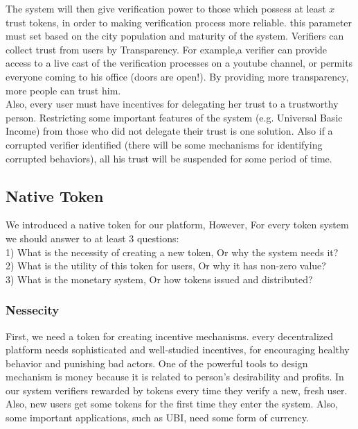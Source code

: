 \documentclass[conference]{IEEEtran}
\begin{document}
The system will then give verification power to those which possess at least $x$ trust tokens, in order to making verification process more reliable. this parameter must set based on the city population and maturity of the system. Verifiers can collect trust from users by Transparency. For example,a verifier can provide access to a live cast of the verification processes on a youtube channel, or permits everyone coming to his office (doors are open!). By providing more transparency, more people can trust him.\\
Also, every user must have incentives for delegating her trust to a trustworthy person. Restricting some important features of the system (e.g. Universal Basic Income) from those who did not delegate their trust is one solution. Also if a corrupted verifier identified (there will be some mechanisms for identifying corrupted behaviors), all his trust will be suspended for some period of time.




\subsection{Native Token}
We introduced a native token for our platform, However, For every  token system we should answer to at least 3 questions:
\\
1) What is the necessity of creating a new token, Or why the system needs it?
\\
2) What is the utility of this token for users, Or why it has non-zero value?
\\
3) What is the monetary system, Or how tokens issued and distributed?
\\
\subsubsection{Nessecity}
First, we need a token for creating incentive mechanisms. every decentralized platform needs sophisticated and well-studied incentives, for encouraging healthy behavior and punishing bad actors. One of the powerful tools to design mechanism is money because it is related to person's desirability and profits. In our system verifiers rewarded by tokens every time they verify a new, fresh user. Also, new users get some tokens for the first time they enter the system. Also, some important applications, such as UBI, need some form of currency.
\end{document}

